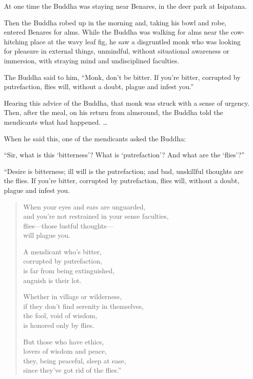 \documentclass[12pt,openany]{book}%
\begin{document}
At one time the Buddha was staying near Benares, in the deer park at Isipatana. 

Then the Buddha robed up in the morning and, taking his bowl and robe, entered Benares for alms. While the Buddha was walking for alms near the cow-hitching place at the wavy leaf fig, he saw a disgruntled monk who was looking for pleasure in external things, unmindful, without situational awareness or immersion, with straying mind and undisciplined faculties. 

The Buddha said to him, “Monk, don’t be bitter. If you’re bitter, corrupted by putrefaction, flies will, without a doubt, plague and infest you.” 

Hearing this advice of the Buddha, that monk was struck with a sense of urgency. Then, after the meal, on his return from almsround, the Buddha told the mendicants what had happened. … 

When he said this, one of the mendicants asked the Buddha: 

“Sir, what is this ‘bitterness’? What is ‘putrefaction’? And what are the ‘flies’?” 

“Desire is bitterness; ill will is the putrefaction; and bad, unskillful thoughts are the flies. If you’re bitter, corrupted by putrefaction, flies will, without a doubt, plague and infest you. 

\begin{verse}%
When your eyes and ears are unguarded, \\
and you’re not restrained in your sense faculties, \\
flies—those lustful thoughts—\\
will plague you. 

A mendicant who’s bitter, \\
corrupted by putrefaction, \\
is far from being extinguished, \\
anguish is their lot. 

Whether in village or wilderness, \\
if they don’t find serenity in themselves, \\
the fool, void of wisdom, \\
is honored only by flies. 

But those who have ethics, \\
lovers of wisdom and peace, \\
they, being peaceful, sleep at ease, \\
since they’ve got rid of the flies.” 

%
\end{verse}
\end{document}
